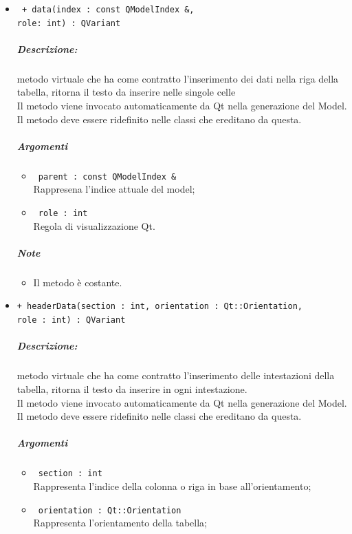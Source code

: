 {\begin{itemize}
	\item \color{blue}\verb! + data(index : const QModelIndex &, !\\
					\verb!role: int) : QVariant!\\
	\color{black}
	\subparagraph{Descrizione:} metodo virtuale che ha come contratto l'inserimento dei dati nella riga della tabella, ritorna il testo da inserire nelle singole celle\\
		Il metodo viene invocato automaticamente da Qt\g{} nella generazione del Model.\\
		Il metodo deve essere ridefinito nelle classi che ereditano da questa.\\
	\subparagraph{Argomenti}
		\begin{itemize}
			\item \color{RoyalPurple}\verb! parent : const QModelIndex &!\\
			\color{black}Rappresena l'indice attuale del model;
			
			\item \color{RoyalPurple}\verb! role : int!\\
			\color{black}Regola di visualizzazione Qt\g{}.
		\end{itemize}
	\subparagraph{Note}
			\begin{itemize}
				\item Il metodo è costante.
			\end{itemize}
		
	\item \color{blue}\verb!+ headerData(section : int, orientation : Qt::Orientation,!\\
	  \verb!role : int) : QVariant!\\
	\color{black}
	\subparagraph{Descrizione:} metodo virtuale che ha come contratto l'inserimento delle intestazioni della tabella, ritorna il testo da inserire in ogni intestazione.\\
	Il metodo viene invocato automaticamente da Qt\g{} nella generazione del Model.\\
	Il metodo deve essere ridefinito nelle classi che ereditano da questa.\\
	\subparagraph{Argomenti}
		\begin{itemize}
			\item \color{RoyalPurple}\verb! section : int!\\
			\color{black}Rappresenta l'indice della colonna o riga in base all'orientamento;
			
			\item \color{RoyalPurple}\verb! orientation : Qt::Orientation!\\
			\color{black}Rappresenta l'orientamento della tabella;
			

\end{itemize}
\end{itemize}}
